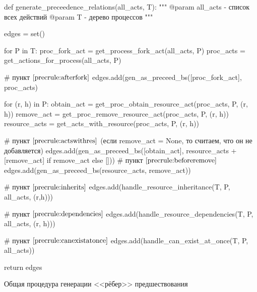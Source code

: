 \begin{listing}[ht!]
\begin{pythoncode}
def generate_preceedence_relations(all_acts, T):
    """
    @param all_acts - список всех действий
    @param T - дерево процессов
    """

    edges = set()

    for P in T:
        proc_fork_act = get_process_fork_act(all_acts, P)
        proc_acts = get_actions_for_process(all_acts, P)

        # пункт $\text{\ref{precrule:afterfork}}$
        edges.add(gen_as_preceed_bs([proc_fork_act], proc_acts)

        for (r, h) in P:
            obtain_act = get_proc_obtain_resource_act(proc_acts, P, (r, h))
            remove_act = get_proc_remove_resource_act(proc_acts, P, (r, h))
            resource_acts = get_acts_with_resource(proc_acts, P, (r, h))

            # пункт $\text{\ref{precrule:actswithres}}$ (если remove_act = None, то считаем, что он не добавляется)
            edges.add(gen_as_preceed_bs([obtain_act], 
                                        resource_acts + [remove_act] if remove_act else []))
            # пункт $\text{\ref{precrule:beforeremove}}$
            edges.add(gen_as_preceed_bs(resource_acts, remove_act))

            # пункт $\text{\ref{precrule:inherits}}$
            edges.add(handle_resource_inheritance(T, P, all_acts, (r,h)))

            # пункт $\text{\ref{precrule:dependencies}}$
            edges.add(handle_resource_dependencies(T, P, all_acts, (r, h)))

        # пункт $\text{\ref{precrule:canexistatonce}}$
        edges.add(handle_can_exist_at_once(T, P, all_acts))

    return edges
\end{pythoncode}
\caption{Общая процедура генерации <<рёбер>> предшествования}
\label{code:relgen}
\end{listing}

